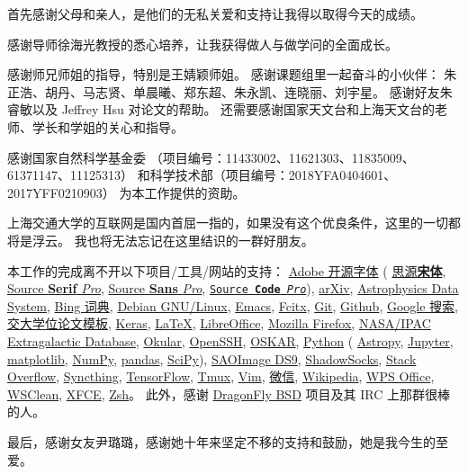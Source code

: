 
\begin{thanks}

首先感谢父母和亲人，是他们的无私关爱和支持让我得以取得今天的成绩。

感谢导师徐海光教授的悉心培养，让我获得做人与做学问的全面成长。

感谢师兄师姐的指导，特别是王婧颖师姐。
感谢课题组里一起奋斗的小伙伴：
朱正浩、胡丹、马志贤、单晨曦、郑东超、朱永凯、连晓丽、刘宇星。
感谢好友朱睿敏以及 Jeffrey Hsu 对论文的帮助。
还需要感谢国家天文台和上海天文台的老师、学长和学姐的关心和指导。

感谢国家自然科学基金委
（项目编号：11433002、11621303、11835009、61371147、11125313）
和科学技术部（项目编号：2018YFA0404601、2017YFF0210903）
为本工作提供的资助。

上海交通大学的互联网是国内首屈一指的，如果没有这个优良条件，这里的一切都将是浮云。
我也将无法忘记在这里结识的一群好朋友。

本工作的完成离不开以下项目/工具/网站的支持：
\href{https://github.com/adobe-fonts}{Adobe 开源字体} (%
\href{https://github.com/adobe-fonts/source-han-serif}{思源\textbf{宋体}},
\href{https://github.com/adobe-fonts/source-serif-pro}{Source \textbf{Serif} \textit{Pro}},
\href{https://github.com/adobe-fonts/source-sans-pro}{\textsf{Source \textbf{Sans} \textit{Pro}}},
\href{https://github.com/adobe-fonts/source-code-pro}{\texttt{Source \textbf{Code} \textit{Pro}}}),
\href{https://arxiv.org/}{arXiv},
\href{http://ads.harvard.edu/}{Astrophysics Data System},
\href{https://www.bing.com/dict}{Bing 词典},
\href{https://www.debian.org/}{Debian GNU/Linux},
\href{https://www.gnu.org/s/emacs/}{Emacs},
\href{https://fcitx-im.org/}{Fcitx},
\href{https://git-scm.com/}{Git},
\href{https://github.com/}{Github},
\href{https://www.google.com/}{Google 搜索},
\href{https://github.com/sjtug/SJTUThesis}{交大学位论文模板},
\href{https://keras.io/}{Keras},
\href{https://www.latex-project.org/}{\LaTeX},
\href{https://www.libreoffice.org/}{LibreOffice},
\href{https://www.mozilla.org/en-US/firefox/}{Mozilla Firefox},
\href{https://ned.ipac.caltech.edu/}{NASA/IPAC Extragalactic Database},
\href{https://okular.kde.org/}{Okular},
\href{https://www.openssh.com/}{OpenSSH},
\href{https://github.com/OxfordSKA/OSKAR}{OSKAR},
\href{https://www.python.org/}{Python} (%
\href{https://www.astropy.org/}{Astropy},
\href{https://jupyter.org/}{Jupyter},
\href{https://matplotlib.org/}{matplotlib},
\href{https://www.numpy.org/}{NumPy},
\href{https://pandas.pydata.org/}{pandas},
\href{https://scipy.org/}{SciPy}),
\href{http://ds9.si.edu/}{SAOImage DS9},
\href{https://shadowsocks.org/}{ShadowSocks},
\href{https://stackoverflow.com/}{Stack Overflow},
\href{https://syncthing.net/}{Syncthing},
\href{https://www.tensorflow.org/}{TensorFlow},
\href{https://github.com/tmux/tmux}{Tmux},
\href{https://www.vim.org/}{Vim},
\href{https://www.wechat.com/}{微信},
\href{https://www.wikipedia.org/}{Wikipedia},
\href{http://wps-community.org/}{WPS Office},
\href{https://sourceforge.net/projects/wsclean/}{WSClean},
\href{https://www.xfce.org/}{XFCE},
\href{http://www.zsh.org/}{Zsh}。
此外，感谢 \href{https://www.dragonflybsd.org/}{DragonFly BSD}
项目及其 IRC 上那群很棒的人。

最后，感谢女友尹璐璐，感谢她十年来坚定不移的支持和鼓励，她是我今生的至爱。

\end{thanks}

